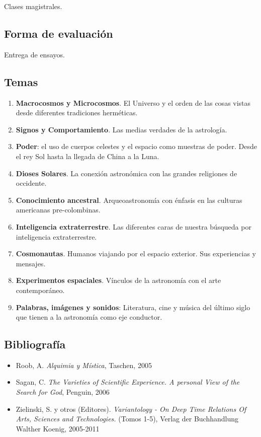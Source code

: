 \documentclass{report}
\begin{document}
Clases magistrales.

\subsection*{Forma de evaluaci\'on}

Entrega de ensayos.

\subsection*{Temas}

\begin{enumerate}
\item {\bf Macrocosmos y Microcosmos}. El Universo y el orden de las
  cosas vistas desde diferentes tradiciones herm\'eticas.
\item {\bf Signos y Comportamiento}. Las medias verdades de la astrolog\'ia.
\item {\bf Poder}: el uso de cuerpos celestes y el espacio como muestras de poder. Desde el rey Sol hasta la llegada de China a la Luna.
\item {\bf Dioses Solares}. La conexi\'on astron\'omica con las grandes religiones de occidente. 
\item {\bf Conocimiento ancestral}. Arqueoastronom\'ia con \'enfasis en las culturas americanas pre-colombinas.
\item {\bf Inteligencia extraterrestre}. Las diferentes caras de
  nuestra b\'usqueda por inteligencia extraterrestre.
\item {\bf Cosmonautas}. Humanos viajando por el espacio exterior. Sus experiencias y mensajes.
\item {\bf Experimentos espaciales}. V\'inculos de la astronom\'ia con
  el arte contempor\'aneo.
\item {\bf Palabras, im\'agenes y sonidos}: Literatura, cine y
  m\'usica del \'ultimo siglo que tienen a la astronom\'ia como eje conductor.
\end{enumerate}

\subsection*{Bibliografía}

\begin{itemize}
\item Roob, A. \emph{Alquimia y M\'istica}, Taschen, 2005
\item Sagan, C. \emph{The Varieties of Scientific Experience. A personal View of the Search for God}, Penguin, 2006
\item Zielinski, S. y otros (Editores). \emph{Variantology - On Deep Time
  Relations Of Arts, Sciences and Technologies.} (Tomos 1-5), Verlag
der Buchhandlung Walther Koenig, 2005-2011
\end{itemize}
\end{document}
